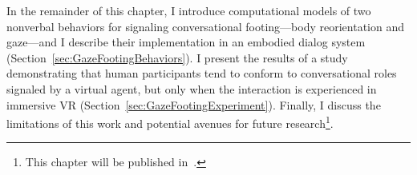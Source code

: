 In the remainder of this chapter, I introduce computational models of two nonverbal behaviors for signaling conversational footing---body reorientation and gaze---and I describe their implementation in an embodied dialog system (Section~\ref{sec:GazeFootingBehaviors}). I present the results of a study demonstrating that human participants tend to conform to conversational roles signaled by a virtual agent, but only when the interaction is experienced in immersive VR  (Section~\ref{sec:GazeFootingExperiment}). Finally, I discuss the limitations of this work and potential avenues for future research\footnote{This chapter will be published in~\citet{pejsa2017whome}.}. 